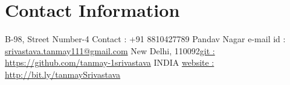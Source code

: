 \newenvironment{outerlist}[1][\enskip\textbullet]%
        {\begin{itemize}[#1,leftmargin=*]}{\end{itemize}%
         \vspace{-.6\baselineskip}}

\newenvironment{lonelist}[1][\enskip\textbullet]%
        {\begin{list}{#1}{%
        \setlength{\partopsep}{0pt}%
        \setlength{\topsep}{0pt}}}
        {\end{list}\vspace{-.6\baselineskip}}

\newenvironment{innerlist}[1][\enskip\textbullet]%
        {\begin{itemize}[#1,leftmargin=*,parsep=0pt,itemsep=0pt,topsep=0pt,partopsep=0pt]}
        {\end{itemize}}

\newenvironment{loneinnerlist}[1][\enskip\textbullet]%
        {\begin{itemize}[#1,leftmargin=*,parsep=0pt,itemsep=0pt,topsep=0pt,partopsep=0pt]}
        {\end{itemize}\vspace{-.6\baselineskip}}

\newcommand{\blankline}{\quad\pagebreak[3]}
\newcommand{\halfblankline}{\quad\vspace{-0.5\baselineskip}\pagebreak[3]}

\newcommand\doilink[1]{\href{http://dx.doi.org/#1}{#1}}
\newcommand\doi[1]{doi:\doilink{#1}}

\providecommand*\url[1]{\href{#1}{#1}}
\renewcommand*\url[1]{\href{#1}{\texttt{#1}}}
\providecommand*\email[1]{\href{mailto:#1}{#1}}

\providecommand\BibTeX{{B\kern-.05em{\sc i\kern-.025em b}\kern-.08em
    \TeX}}
\providecommand\Matlab{\textsc{Matlab}}




\section{Contact Information}

\newlength{\rcollength}\setlength{\rcollength}{1.4in}%


B-98, Street Number-4 \hfill {Contact : +91 8810427789} \newline
Pandav Nagar \hfill {e-mail id : \email{srivastava.tanmay111@gmail.com}} \newline
New Delhi, 110092\hfill  \href{https://github.com/tanmay-1srivastava}{git : https://github.com/tanmay-1srivastava} \newline
INDIA \hfill \href{http://bit.ly/tanmaySrivastava}{website : http://bit.ly/tanmaySrivastava}


